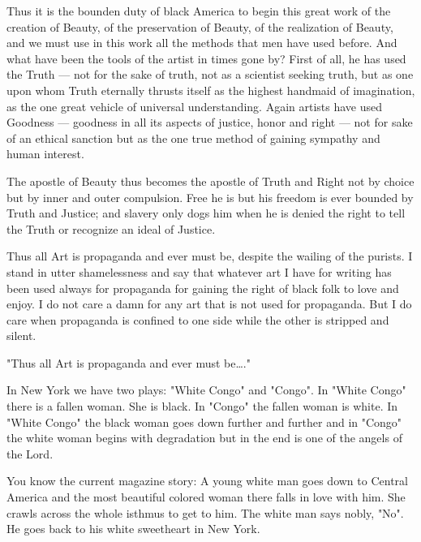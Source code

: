 \documentclass[12pt]{article}
\begin{document}
{\duboispara}%
Thus it is the bounden duty of black America to begin this great work of the creation of Beauty, of the preservation of Beauty, of the realization of Beauty, and we must use in this work all the methods that men have used before. And what have been the tools of the artist in times gone by? First of all, he has used the Truth --- not for the sake of truth, not as a scientist seeking truth, but as one upon whom Truth eternally thrusts itself as the highest handmaid of imagination, as the one great vehicle of universal understanding. Again artists have used Goodness --- goodness in all its aspects of justice, honor and right --- not for sake of an ethical sanction but as the one true method of gaining sympathy and human interest. 



{\duboispara}%
The apostle of Beauty thus becomes the apostle of Truth and Right not by choice but by inner and outer compulsion. Free he is but his freedom is ever bounded by Truth and Justice; and slavery only dogs him when he is denied the right to tell the Truth or recognize an ideal of Justice. 

{\duboispara}%
Thus all Art is propaganda and ever must be, despite the wailing of the purists. I stand in utter shamelessness and say that whatever art I have for writing has been used always for propaganda for gaining the right of black folk to love and enjoy. I do not care a damn for any art that is not used for propaganda. But I do care when propaganda is confined to one side while the other is stripped and silent. 


"Thus all Art is propaganda and ever must be\ldots."

{\duboispara}%
In New York we have two plays: "White Congo" and "Congo".  In "White Congo" there is a fallen woman. She is black. In "Congo" the fallen woman is white. In "White Congo" the black woman goes down further and further and in "Congo" the white woman begins with degradation but in the end is one of the angels of the Lord. 

{\duboispara}%
You know the current magazine story: A young white man goes down to Central America and the most beautiful colored woman there falls in love with him. She crawls across the whole isthmus to get to him. The white man says nobly, "No". He goes back to his white sweetheart in New York. 
\end{document}
